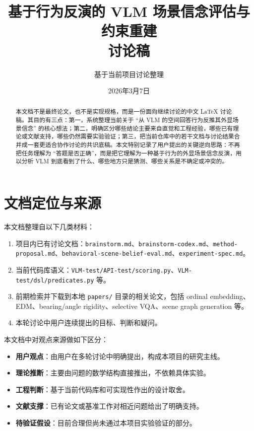 \documentclass[11pt,a4paper]{ctexart}
\title{基于行为反演的 VLM 场景信念评估与约束重建\\讨论稿}
\author{基于当前项目讨论整理}
\date{2026年3月7日}
\begin{document}
\maketitle

\begin{abstract}
本文档不是最终论文，也不是实现规格，而是一份面向继续讨论的中文 LaTeX 讨论稿。其目的有三点：第一，系统整理当前关于 ``从 VLM 的空间回答行为反推其外显场景信念'' 的核心想法；第二，明确区分哪些结论主要来自直觉和工程经验，哪些已有理论或文献支持，哪些仍然需要实验验证；第三，把当前仓库中的若干文档与讨论结果合并成一套更适合协作讨论的共识底稿。本文特别记录了用户提出的关键逆向思路：不再把任务理解为 ``答题是否正确''，而是把它理解为一种基于行为的外显场景信念反演，用以分析 VLM 到底看到了什么、哪些地方只是猜测、哪些关系是不确定或冲突的。
\end{abstract}

\section{文档定位与来源}

本文档整理自以下几类材料：

\begin{enumerate}[label=\arabic*.]
  \item 项目内已有讨论文档：\texttt{brainstorm.md}、\texttt{brainstorm-codex.md}、\texttt{method-proposal.md}、\texttt{behavioral-scene-belief-eval.md}、\texttt{experiment-spec.md}。
  \item 当前代码库语义：\texttt{VLM-test/API-test/scoring.py}、\texttt{VLM-test/dsl/predicates.py} 等。
  \item 前期检索并下载到本地 \texttt{papers/} 目录的相关论文，包括 ordinal embedding、EDM、bearing/angle rigidity、selective VQA、scene graph generation 等。
  \item 本轮讨论中用户连续提出的目标、判断和疑问。
\end{enumerate}

本文档中对观点来源做如下区分：

\begin{itemize}
  \item \textbf{用户观点}：由用户在多轮讨论中明确提出，构成本项目的研究主线。
  \item \textbf{理论推断}：主要由问题的数学结构直接推出，不依赖具体实验。
  \item \textbf{工程判断}：基于当前代码库和可实现性作出的设计取舍。
  \item \textbf{文献支撑}：已有论文或基准工作对相近问题给出了明确支持。
  \item \textbf{待验证假设}：目前合理但尚未通过本项目实验验证的部分。
\end{itemize}
\end{document}
